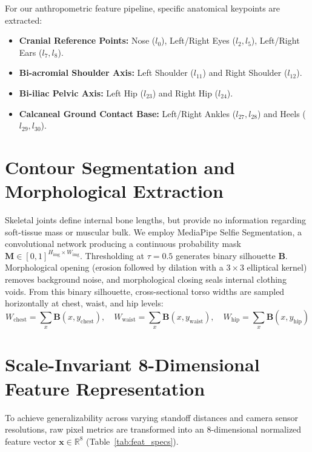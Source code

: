 \documentclass[12pt,a4paper,oneside]{report}
\begin{document}
For our anthropometric feature pipeline, specific anatomical keypoints are extracted:
\begin{itemize}
    \item \textbf{Cranial Reference Points:} Nose ($l_0$), Left/Right Eyes ($l_2, l_5$), Left/Right Ears ($l_7, l_8$).
    \item \textbf{Bi-acromial Shoulder Axis:} Left Shoulder ($l_{11}$) and Right Shoulder ($l_{12}$).
    \item \textbf{Bi-iliac Pelvic Axis:} Left Hip ($l_{23}$) and Right Hip ($l_{24}$).
    \item \textbf{Calcaneal Ground Contact Base:} Left/Right Ankles ($l_{27}, l_{28}$) and Heels ($l_{29}, l_{30}$).
\end{itemize}

\section{Contour Segmentation and Morphological Extraction}
Skeletal joints define internal bone lengths, but provide no information regarding soft-tissue mass or muscular bulk. We employ MediaPipe Selfie Segmentation, a convolutional network producing a continuous probability mask $\mathbf{M} \in [0, 1]^{H_{\text{img}} \times W_{\text{img}}}$. Thresholding at $\tau = 0.5$ generates binary silhouette $\mathbf{B}$. Morphological opening (erosion followed by dilation with a $3 \times 3$ elliptical kernel) removes background noise, and morphological closing seals internal clothing voids. From this binary silhouette, cross-sectional torso widths are sampled horizontally at chest, waist, and hip levels:
\begin{equation}
W_{\text{chest}} = \sum_{x} \mathbf{B}(x, y_{\text{chest}}), \quad W_{\text{waist}} = \sum_{x} \mathbf{B}(x, y_{\text{waist}}), \quad W_{\text{hip}} = \sum_{x} \mathbf{B}(x, y_{\text{hip}})
\end{equation}

\section{Scale-Invariant 8-Dimensional Feature Representation}
To achieve generalizability across varying standoff distances and camera sensor resolutions, raw pixel metrics are transformed into an 8-dimensional normalized feature vector $\mathbf{x} \in \mathbb{R}^8$ (Table~\ref{tab:feat_specs}).
\end{document}
